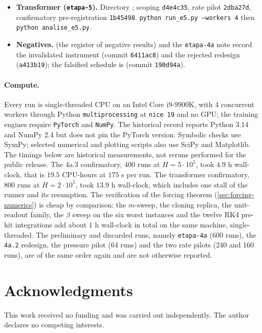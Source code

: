\documentclass[11pt]{article}
\theoremstyle{definition}
\theoremstyle{remark}
\begin{document}
{\begin{itemize}
\item \textbf{Transformer (\texttt{etapa-5}).} Directory
; scoping \texttt{d4e4c35}, rate
pilot \texttt{2dba27d}, confirmatory
pre-registration \texttt{1b45498}.
\texttt{python run\_e5.py --workers 4} then \texttt{python analise\_e5.py}.
\item \textbf{Negatives.}  (the register of
negative results) and the \texttt{etapa-4a} note record the invalidated instrument
(commit \texttt{6411ac8}) and the rejected redesign (\texttt{a413b19}); the
falsified schedule is  (commit \texttt{190d94a}).
\end{itemize}
\par}

\paragraph{Compute.}
Every run is single-threaded CPU on an Intel Core i9-9900K, with 4 concurrent
workers through Python \texttt{multiprocessing} at \texttt{nice 19} and no GPU;
the training engines require \texttt{PyTorch} and \texttt{NumPy}. The
historical record reports Python 3.14 and NumPy 2.4 but does not pin the
PyTorch version. Symbolic checks use SymPy; selected numerical and plotting
scripts also use SciPy and Matplotlib. The timings below are historical
measurements, not reruns performed for the public release. The 4a.3
confirmatory, 400 runs at $H=5\cdot10^{5}$, took $4.9$ h wall-clock, that is
$19.5$ CPU-hours at $175$ s per run. The transformer confirmatory, 800 runs at
$H=2\cdot10^{5}$, took $13.9$ h wall-clock, which includes one stall of the
runner and its resumption. The verification of the forcing theorem
(\cref{sec:forcing-numerics}) is cheap by comparison: the $m$-sweep, the
cloning replica, the unit-readout family, the $\beta$ sweep on the six worst
instances and the twelve RK4 pre-hit integrations add about $1$ h wall-clock in
total on the same machine, single-threaded. The preliminary and discarded
runs, namely \texttt{etapa-4a} (600 runs), the \texttt{4a.2} redesign, the
pressure pilot (64
runs) and the two rate pilots (240 and 160 runs), are of the same order again and
are not otherwise reported.

\section*{Acknowledgments}
This work received no funding and was carried out independently. The author
declares no competing interests.
\end{document}
